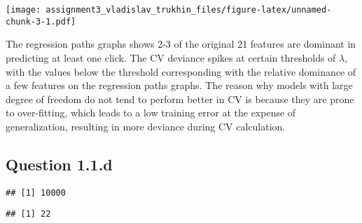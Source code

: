 \documentclass[
]{article}
\newenvironment{Shaded}{\begin{snugshade}}{\end{snugshade}}
\newcommand{\AttributeTok}[1]{\textcolor[rgb]{0.77,0.63,0.00}{#1}}
\newcommand{\CommentTok}[1]{\textcolor[rgb]{0.56,0.35,0.01}{\textit{#1}}}
\newcommand{\DecValTok}[1]{\textcolor[rgb]{0.00,0.00,0.81}{#1}}
\newcommand{\FunctionTok}[1]{\textcolor[rgb]{0.00,0.00,0.00}{#1}}
\newcommand{\NormalTok}[1]{#1}
\newcommand{\OtherTok}[1]{\textcolor[rgb]{0.56,0.35,0.01}{#1}}
\newcommand{\SpecialCharTok}[1]{\textcolor[rgb]{0.00,0.00,0.00}{#1}}
\newcommand{\StringTok}[1]{\textcolor[rgb]{0.31,0.60,0.02}{#1}}
\begin{document}
\texttt{[image: assignment3\_vladislav\_trukhin\_files/figure-latex/unnamed-chunk-3-1.pdf]}

The regression paths graphs shows 2-3 of the original 21 features are
dominant in predicting at least one click. The CV deviance spikes at
certain thresholds of \(\lambda\), with the values below the threshold
corresponding with the relative dominance of a few features on the
regression paths graphs. The reason why models with large degree of
freedom do not tend to perform better in CV is because they are prone to
over-fitting, which leads to a low training error at the expense of
generalization, resulting in more deviance during CV calculation.

\hypertarget{question-1.1.d}{%
\subsection{Question 1.1.d}\label{question-1.1.d}}

\begin{Shaded}
\end{Shaded}

\begin{verbatim}
## [1] 10000
\end{verbatim}

\begin{Shaded}
\end{Shaded}

\begin{verbatim}
## [1] 22
\end{verbatim}
\end{document}
